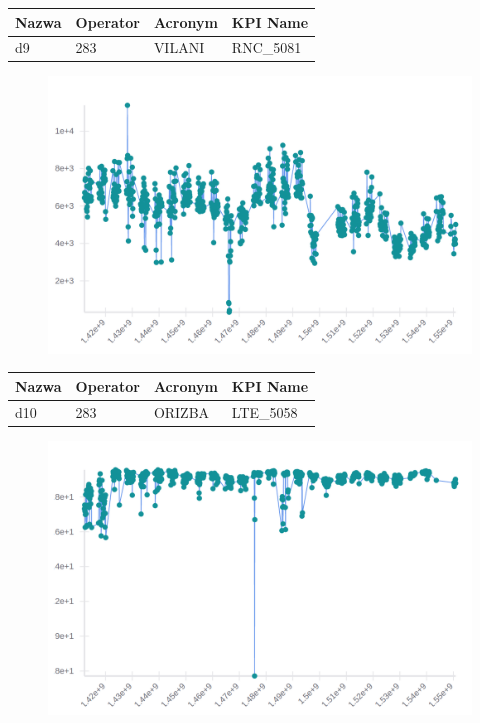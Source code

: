 \documentclass[eng,printmode]{mgr}
\begin{document}
\begingroup
\fontsize{10pt}{12pt}\selectfont
\begin{tabu} to 0.9\textwidth { | X[l] | X[l] | X[l] | X[l] |}
\hline
\textbf{Nazwa} & \textbf{Operator} & \textbf{Acronym} & \textbf{KPI Name} \\
\hline
d9 & 283 & VILANI & RNC\_5081 \\
\hline
\end{tabu}
\endgroup

\begin{figure}[H]
  \begin{center}
  \includegraphics[scale=0.53]{d9}
  \end{center}
\end{figure}
\newpage

\begingroup
\fontsize{10pt}{12pt}\selectfont
\begin{tabu} to 0.9\textwidth { | X[l] | X[l] | X[l] | X[l] |}
\hline
\textbf{Nazwa} & \textbf{Operator} & \textbf{Acronym} & \textbf{KPI Name} \\
\hline
d10 & 283 & ORIZBA & LTE\_5058 \\
\hline
\end{tabu}
\endgroup

\begin{figure}[H]
  \begin{center}
  \includegraphics[scale=0.53]{d10}
  \end{center}
\end{figure}
\newpage
\end{document}
